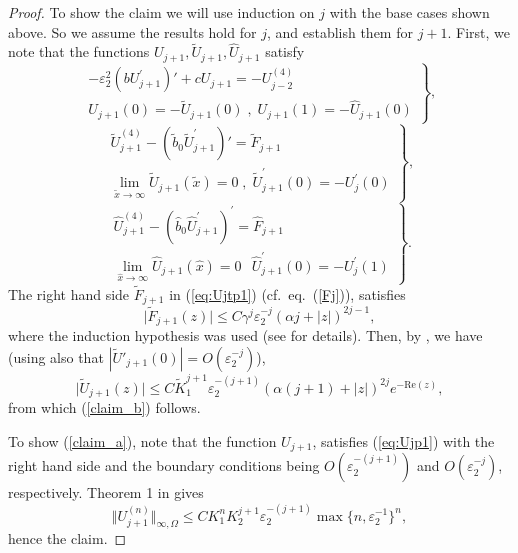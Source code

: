 \documentclass[12pt]{article}
\newcommand{\eps}{\varepsilon}
\begin{document}
\begin{proof}
To show the claim we will use induction on $j$ with the base cases shown above. So we assume the results
hold for $j$, and establish them for $j+1$. First, we note that the functions $U_{j+1}, \tilde{U}_{j+1}, \hat{U}_{j+1}$ satisfy
%
\begin{equation}\label{eq:Ujp1}
\left.
\begin{gathered}
-\eps_2^2\left(b U_{j+1}^{\prime}\right)'+c U_{j+1}=-U_{j-2}^{(4)} \\
U_{j+1}(0)=-\tilde{U}_{j+1}(0) \; , \; U_{j+1}(1)=-\hat{U}_{j+1}(0)
\end{gathered}
\right\},
\end{equation}
%
\begin{equation}\label{eq:Ujtp1}
\left.
\begin{gathered}
\tilde{U}_{j+1}^{(4)}-\left(\tilde{b}_0 \tilde{U}_{j+1}^{\prime}\right)' = \tilde{F}_{j+1} \\
 \lim _{\tilde{x} \rightarrow \infty} \tilde{U}_{j+1}(\tilde{x})=0 \; , \; \tilde{U}_{j+1}^{\prime}(0)=-U_{j}^{\prime}(0)
\end{gathered}
\right\},
\end{equation}
%
\begin{equation}\label{eq:Ujhp1}
\left.
\begin{gathered}
\hat{U}_{j+1}^{(4)}-\left(\hat{b}_0 \hat{U}_{j+1}^{\prime}\right)^{\prime}=\hat{F}_{j+1} \\
\lim _{\hat{x} \rightarrow \infty} \hat{U}_{j+1}(\hat{x})=0 \; \, \;  \hat{U}_{j+1}^{\prime}(0)=-U_{j}^{\prime}(1)
\end{gathered}
\right\}.
\end{equation}
%
The right hand side $\tilde{F}_{j+1}$ in (\ref{eq:Ujtp1}) (cf.~eq.~(\ref{Fj})), satisfies 
$$
\vert \tilde{F}_{j+1}(z) \vert \leq C \gamma^j \eps_2^{-j} (\alpha j + |z| )^{2j-1},
$$
where the induction hypothesis was used (see \cite{PCarXiv} for details). Then, by \cite[Lemma 1]{PCarXiv}, we have (using also
that $|\tilde{U}'_{j+1}(0) | = O(\eps_2^{-j})$),
$$
\vert \tilde{U}_{j+1} (z) \vert \leq C  \tilde{K}^{j+1}_1  \eps_2^{-(j+1)} (\alpha (j+1) +|z|)^{2j} e^{-\text{Re}(z)},
$$
from which (\ref{claim_b}) follows.

To show (\ref{claim_a}), note that the function $U_{j+1}$, satisfies (\ref{eq:Ujp1}) with the right hand side and the boundary conditions being $O\left(\eps_2^{-(j+1)}\right)$ and $O\left(\eps_2^{-j}\right)$, respectively. Theorem 1 in \cite{melenk} gives
%
$$
\Vert U^{(n)}_{j+1} \Vert_{\infty,\Omega} \leq C K_1^n K_2^{j+1} \eps_2^{-(j+1)} \max\{n, \eps_2^{-1} \}^n,
$$
hence the claim.


\end{proof}
\end{document}
